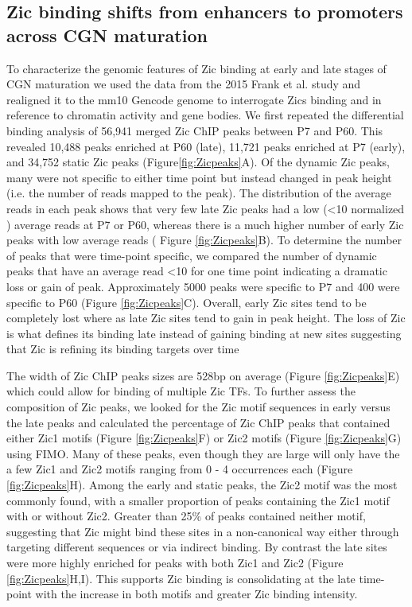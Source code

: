 \documentclass[fleqn,10pt]{wlscirep}
\begin{document}
\subsection*{Zic binding shifts from enhancers to promoters across CGN maturation} 

To characterize the genomic features of Zic binding at early and late stages of CGN maturation we used the data from the 2015 Frank et al. study \cite{Frank2015RegulationCerebellum} and realigned it to the mm10 Gencode genome to interrogate Zics binding and in reference to chromatin activity and gene bodies. We first repeated the differential binding analysis of 56,941 merged Zic ChIP peaks between P7 and P60. This revealed  10,488 peaks enriched at P60 (late), 11,721 peaks enriched at P7 (early), and 34,752 static Zic peaks (Figure\ref{fig:Zicpeaks}A).  Of the dynamic Zic peaks, many were not specific to either time point but instead changed in peak height (i.e. the number of reads mapped to the peak). The distribution of the average reads in each peak shows  that very few late Zic peaks had a low (\textless 10 normalized ) average reads at P7 or P60, whereas there is a much higher number of early Zic peaks with low average reads ( Figure \ref{fig:Zicpeaks}B). To determine the number of peaks that were time-point specific, we compared the number of dynamic peaks that have an average read \textless 10 for one time point  indicating a dramatic loss or gain of peak. Approximately 5000 peaks were specific to P7 and 400 were specific to P60 (Figure \ref{fig:Zicpeaks}C). Overall, early Zic sites tend to be completely lost where as late Zic sites tend to gain in peak height. The loss of Zic is what defines its binding late instead of gaining binding at new sites suggesting that Zic is refining its binding targets over time

The width of Zic ChIP peaks sizes are 528bp on average (Figure \ref{fig:Zicpeaks}E) which could allow for binding of multiple Zic TFs. To further assess the composition of Zic peaks, we looked for the Zic motif sequences in early versus the late peaks and calculated the percentage of Zic ChIP peaks that contained either Zic1 motifs (Figure \ref{fig:Zicpeaks}F) or Zic2 motifs (Figure \ref{fig:Zicpeaks}G) using FIMO.  
Many of these peaks, even though they are large will only have the a few Zic1 and Zic2 motifs ranging from 0 - 4 occurrences each (Figure \ref{fig:Zicpeaks}H). Among the early and static peaks, the Zic2 motif was the most commonly found, with a smaller proportion of peaks containing the Zic1 motif with or without Zic2. Greater than 25\% of peaks contained neither motif, suggesting that Zic might bind these sites in a non-canonical way either through targeting different sequences or via indirect binding. By contrast the late sites were more highly enriched for peaks with both Zic1 and Zic2 (Figure \ref{fig:Zicpeaks}H,I). This supports Zic binding is consolidating at the late time-point with the increase in both motifs and greater Zic binding intensity.
\end{document}
